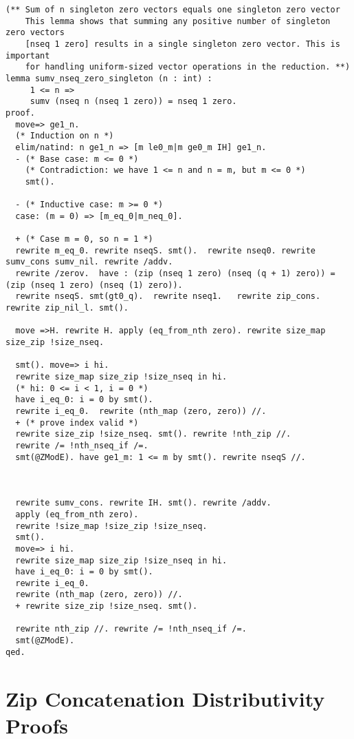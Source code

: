 \begin{lstlisting}[style=easycrypt, caption=Proof of Sumv of Singleton Zero Vectors, breaklines=true, breakatwhitespace=true, frame=single, keepspaces=true]
(** Sum of n singleton zero vectors equals one singleton zero vector
    This lemma shows that summing any positive number of singleton zero vectors
    [nseq 1 zero] results in a single singleton zero vector. This is important
    for handling uniform-sized vector operations in the reduction. **)
lemma sumv_nseq_zero_singleton (n : int) :
     1 <= n =>
     sumv (nseq n (nseq 1 zero)) = nseq 1 zero.
proof.
  move=> ge1_n.
  (* Induction on n *)
  elim/natind: n ge1_n => [m le0_m|m ge0_m IH] ge1_n.
  - (* Base case: m <= 0 *)
    (* Contradiction: we have 1 <= n and n = m, but m <= 0 *)   
    smt().
    
  - (* Inductive case: m >= 0 *)
  case: (m = 0) => [m_eq_0|m_neq_0].

  + (* Case m = 0, so n = 1 *)
  rewrite m_eq_0. rewrite nseqS. smt().  rewrite nseq0. rewrite sumv_cons sumv_nil. rewrite /addv.
  rewrite /zerov.  have : (zip (nseq 1 zero) (nseq (q + 1) zero)) =   (zip (nseq 1 zero) (nseq (1) zero)).
  rewrite nseqS. smt(gt0_q).  rewrite nseq1.   rewrite zip_cons. rewrite zip_nil_l. smt().

  move =>H. rewrite H. apply (eq_from_nth zero). rewrite size_map size_zip !size_nseq.

  smt(). move=> i hi.
  rewrite size_map size_zip !size_nseq in hi.
  (* hi: 0 <= i < 1, i = 0 *)
  have i_eq_0: i = 0 by smt().
  rewrite i_eq_0.  rewrite (nth_map (zero, zero)) //.
  + (* prove index valid *)
  rewrite size_zip !size_nseq. smt(). rewrite !nth_zip //.
  rewrite /= !nth_nseq_if /=. 
  smt(@ZModE). have ge1_m: 1 <= m by smt(). rewrite nseqS //.



  rewrite sumv_cons. rewrite IH. smt(). rewrite /addv.
  apply (eq_from_nth zero).
  rewrite !size_map !size_zip !size_nseq.
  smt().
  move=> i hi.
  rewrite size_map size_zip !size_nseq in hi.
  have i_eq_0: i = 0 by smt().
  rewrite i_eq_0.
  rewrite (nth_map (zero, zero)) //.
  + rewrite size_zip !size_nseq. smt().
  
  rewrite nth_zip //. rewrite /= !nth_nseq_if /=.
  smt(@ZModE).
qed.
\end{lstlisting}

\section{Zip Concatenation Distributivity Proofs}
\label{sec:zip-cat-proofs}

